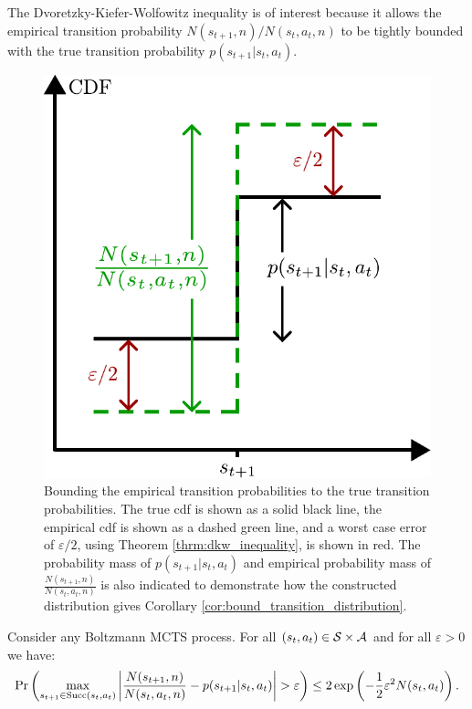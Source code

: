             The Dvoretzky-Kiefer-Wolfowitz inequality is of interest because it allows the empirical transition probability $N(s_{t+1},n)/N(s_t,a_t,n)$ to be tightly bounded with the true transition probability $p(s_{t+1}|s_t,a_t)$. 
            \begin{figure}
                \centering
                \includegraphics[scale=0.6]{figures/ch4/dkw_diagram.pdf}
                \caption[Bounding the empirical transition probabilities to the true transition probabilities.]{Bounding the empirical transition probabilities to the true transition probabilities. The true cdf is shown as a solid black line, the empirical cdf is shown as a dashed green line, and a worst case error of $\varepsilon/2$, using Theorem \ref{thrm:dkw_inequality}, is shown in red. The probability mass of $p(s_{t+1}|s_t,a_t)$ and empirical probability mass of $\frac{N(s_{t+1},n)}{N(s_t,a_t,n)}$ is also indicated to demonstrate how the constructed distribution gives Corollary \ref{cor:bound_transition_distribution}.}
                \label{fig:dkw_diag}
            \end{figure}
            \begin{corollary} \label{cor:bound_transition_distribution}
                Consider any Boltzmann MCTS process. For all $(s_t,a_t)\in\mathcal{S}\times\mathcal{A}$ and for all $\varepsilon >0$ we have:
                \begin{align}
                    \Pr\left(\max_{s_{t+1}\in{\textnormal{Succ}(s_t,a_t)}}\left| \frac{N(s_{t+1},n)}{N(s_t,a_t,n)} - p(s_{t+1}|s_t,a_t) \right| > \varepsilon \right) \leq 2 \exp\left(-\frac{1}{2}\varepsilon^2 N(s_t,a_t) \right).
                \end{align}
            \end{corollary}

